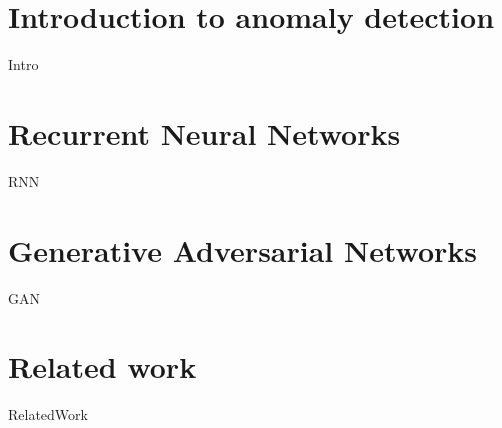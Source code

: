 \section{Introduction to anomaly detection}
{Intro}

\section{Recurrent Neural Networks}
{RNN}

\section{Generative Adversarial Networks}
{GAN}

\section{Related work}
{RelatedWork}